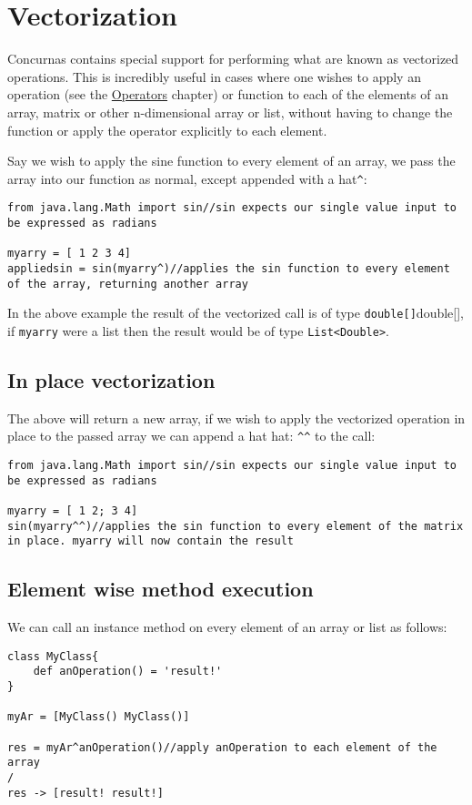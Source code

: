 \documentclass[conc-doc]{subfiles}
\begin{document}
	
	\chapter[Vectorization]{Vectorization}
	
Concurnas contains special support for performing what are known as vectorized operations. This is incredibly useful in cases where one wishes to apply an operation (see the \hyperref[ch:Operators]{Operators} chapter) or function to each of the elements of an array, matrix or other n-dimensional array or list, without having to change the function or apply the operator explicitly to each element.

Say we wish to apply the sine function to every element of an array, we pass the array into our function as normal, except appended with a hat\lstinline{^}:
\begin{lstlisting}
from java.lang.Math import sin//sin expects our single value input to be expressed as radians

myarry = [ 1 2 3 4]
appliedsin = sin(myarry^)//applies the sin function to every element of the array, returning another array
\end{lstlisting}

In the above example the result of the vectorized call is of type \lstinline{double[]}double[], if \lstinline{myarry} were a list then the result would be of type \lstinline{List<Double>}.

\section{In place vectorization}
The above will return a new array, if we wish to apply the vectorized operation in place to the passed array we can append a hat hat: \lstinline{^^} to the call:
\begin{lstlisting}
from java.lang.Math import sin//sin expects our single value input to be expressed as radians

myarry = [ 1 2; 3 4]
sin(myarry^^)//applies the sin function to every element of the matrix in place. myarry will now contain the result
\end{lstlisting}

\section{Element wise method execution}
We can call an instance method on every element of an array or list as follows:
\begin{lstlisting}
class MyClass{
	def anOperation() = 'result!'
}

myAr = [MyClass() MyClass()]

res = myAr^anOperation()//apply anOperation to each element of the array
/
res -> [result! result!]
\end{lstlisting}
\end{document}
